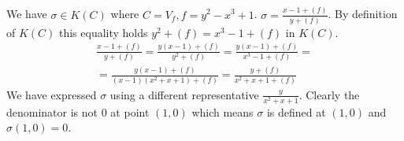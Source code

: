 \documentclass[12pt, a4paper]{article}
\begin{document}
\section{}
We have $\sigma \in K(C)$ where $C = V_f, f = y^2-x^3+1$. $\sigma = \frac{x-1+(f)}{y+(f)}$. By definition of $K(C)$ this equality holds $y^2+(f)=x^3-1+(f)$ in $K(C)$.
\begin{gather*}
\frac{x-1+(f)}{y+(f)} = \frac{y(x-1)+(f)}{y^2+(f)} = \frac{y(x-1)+(f)}{x^3-1+(f)} = \\
=\frac{y(x-1)+(f)}{(x-1)(x^2+x+1)+(f)} = \frac{y + (f)}{x^2+x+1+(f)}
\end{gather*}
We have expressed $\sigma$ using a different representative $\frac{y}{x^2+x+1}$. Clearly the denominator is not $0$ at point $(1,0)$ which means $\sigma$ is defined at $(1,0)$ and $\sigma(1,0)=0$.
\end{document}

